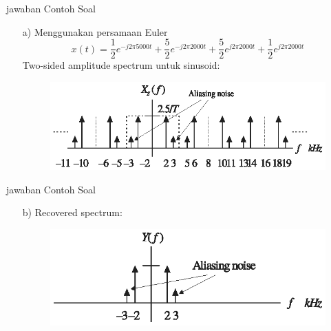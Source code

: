 \documentclass[pdflatex,compress,mathserif]{beamer}
\begin{document}
\begin{frame}{jawaban Contoh Soal}
    \begin{enumerate}
        \item[a)] Menggunakan persamaan Euler
        $$x(t) = \frac{1}{2}e^{-j2 \pi 5000 t} + \frac{5}{2}e^{-j2 \pi 2000 t} + \frac{5}{2}e^{j2 \pi 2000 t} + \frac{1}{2}e^{j2 \pi 2000 t} $$
        Two-sided amplitude spectrum untuk sinusoid:
        \begin{figure}
            \includegraphics[width=\linewidth]{img/img20}
        \end{figure}
    \end{enumerate}
\end{frame}

\begin{frame}{jawaban Contoh Soal}
    \begin{enumerate}
        \item[b)] Recovered spectrum:
        \begin{figure}
            \includegraphics[width=\linewidth]{img/img21}
        \end{figure}
    \end{enumerate}
\end{frame}
\end{document}
